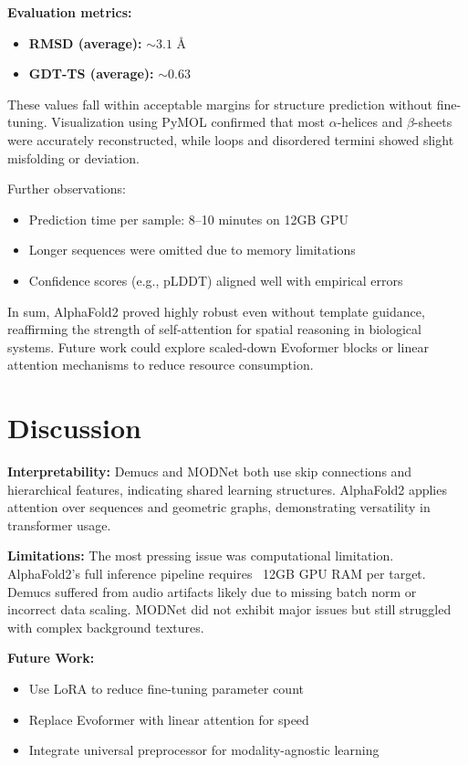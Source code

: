 \documentclass{article}
\begin{document}
\textbf{Evaluation metrics:}
\begin{itemize}
  \item \textbf{RMSD (average):} $\sim3.1$ \AA
  \item \textbf{GDT-TS (average):} $\sim0.63$
\end{itemize}

These values fall within acceptable margins for structure prediction without fine-tuning. Visualization using PyMOL confirmed that most $\alpha$-helices and $\beta$-sheets were accurately reconstructed, while loops and disordered termini showed slight misfolding or deviation.

Further observations:
\begin{itemize}
  \item Prediction time per sample: 8--10 minutes on 12GB GPU
  \item Longer sequences were omitted due to memory limitations
  \item Confidence scores (e.g., pLDDT) aligned well with empirical errors
\end{itemize}

In sum, AlphaFold2 proved highly robust even without template guidance, reaffirming the strength of self-attention for spatial reasoning in biological systems. Future work could explore scaled-down Evoformer blocks or linear attention mechanisms to reduce resource consumption.

\section{Discussion}
\textbf{Interpretability:}  
Demucs and MODNet both use skip connections and hierarchical features, indicating shared learning structures. AlphaFold2 applies attention over sequences and geometric graphs, demonstrating versatility in transformer usage.

\textbf{Limitations:}  
The most pressing issue was computational limitation. AlphaFold2’s full inference pipeline requires ~12GB GPU RAM per target. Demucs suffered from audio artifacts likely due to missing batch norm or incorrect data scaling. MODNet did not exhibit major issues but still struggled with complex background textures.

\textbf{Future Work:}
\begin{itemize}
  \item Use LoRA to reduce fine-tuning parameter count
  \item Replace Evoformer with linear attention for speed
  \item Integrate universal preprocessor for modality-agnostic learning
\end{itemize}
\end{document}
